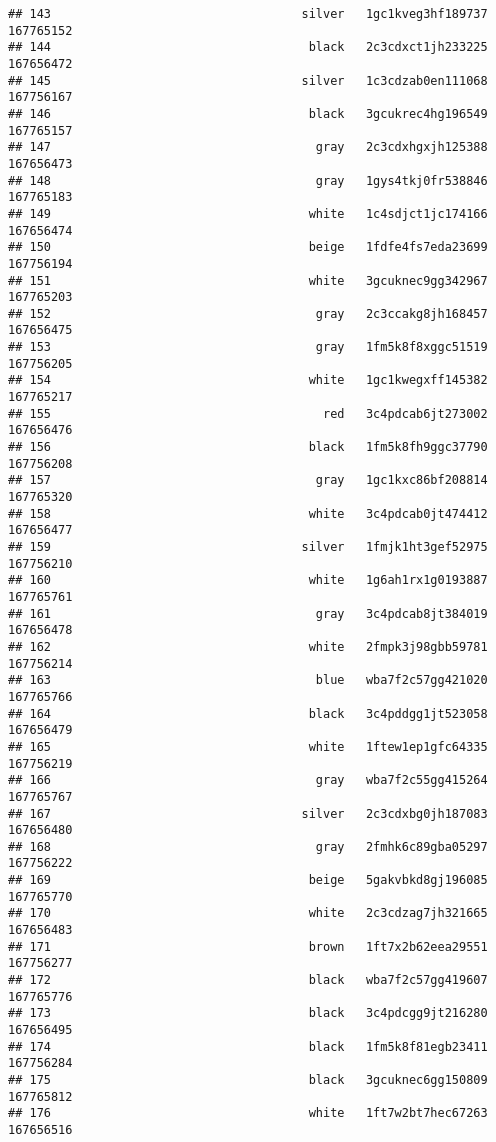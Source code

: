 \documentclass[
]{article}
\begin{document}
\begin{verbatim}
## 143                                   silver   1gc1kveg3hf189737 167765152
## 144                                    black   2c3cdxct1jh233225 167656472
## 145                                   silver   1c3cdzab0en111068 167756167
## 146                                    black   3gcukrec4hg196549 167765157
## 147                                     gray   2c3cdxhgxjh125388 167656473
## 148                                     gray   1gys4tkj0fr538846 167765183
## 149                                    white   1c4sdjct1jc174166 167656474
## 150                                    beige   1fdfe4fs7eda23699 167756194
## 151                                    white   3gcuknec9gg342967 167765203
## 152                                     gray   2c3ccakg8jh168457 167656475
## 153                                     gray   1fm5k8f8xggc51519 167756205
## 154                                    white   1gc1kwegxff145382 167765217
## 155                                      red   3c4pdcab6jt273002 167656476
## 156                                    black   1fm5k8fh9ggc37790 167756208
## 157                                     gray   1gc1kxc86bf208814 167765320
## 158                                    white   3c4pdcab0jt474412 167656477
## 159                                   silver   1fmjk1ht3gef52975 167756210
## 160                                    white   1g6ah1rx1g0193887 167765761
## 161                                     gray   3c4pdcab8jt384019 167656478
## 162                                    white   2fmpk3j98gbb59781 167756214
## 163                                     blue   wba7f2c57gg421020 167765766
## 164                                    black   3c4pddgg1jt523058 167656479
## 165                                    white   1ftew1ep1gfc64335 167756219
## 166                                     gray   wba7f2c55gg415264 167765767
## 167                                   silver   2c3cdxbg0jh187083 167656480
## 168                                     gray   2fmhk6c89gba05297 167756222
## 169                                    beige   5gakvbkd8gj196085 167765770
## 170                                    white   2c3cdzag7jh321665 167656483
## 171                                    brown   1ft7x2b62eea29551 167756277
## 172                                    black   wba7f2c57gg419607 167765776
## 173                                    black   3c4pdcgg9jt216280 167656495
## 174                                    black   1fm5k8f81egb23411 167756284
## 175                                    black   3gcuknec6gg150809 167765812
## 176                                    white   1ft7w2bt7hec67263 167656516

\end{verbatim}
\end{document}
